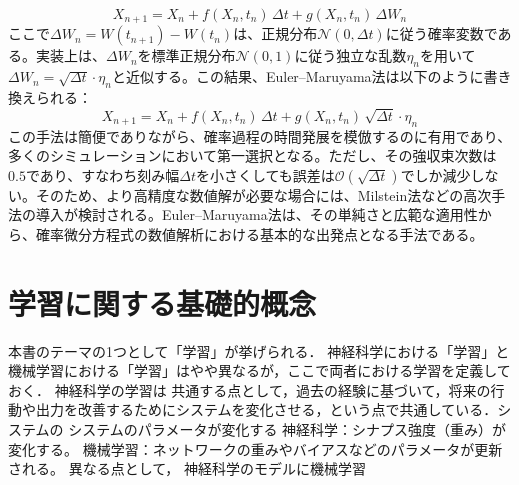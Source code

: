\begin{equation}
X_{n+1} = X_n + f(X_n, t_n)\, \Delta t + g(X_n, t_n)\, \Delta W_n
\end{equation}
ここで$\Delta W_n = W(t_{n+1}) - W(t_n)$は、正規分布$\mathcal{N}(0, \Delta t)$に従う確率変数である。実装上は、$\Delta W_n$を標準正規分布$\mathcal{N}(0, 1)$に従う独立な乱数$\eta_n$を用いて$\Delta W_n = \sqrt{\Delta t} \cdot \eta_n$と近似する。この結果、Euler–Maruyama法は以下のように書き換えられる：
\begin{equation}
X_{n+1} = X_n + f(X_n, t_n)\, \Delta t + g(X_n, t_n)\, \sqrt{\Delta t} \cdot \eta_n
\end{equation}
この手法は簡便でありながら、確率過程の時間発展を模倣するのに有用であり、多くのシミュレーションにおいて第一選択となる。ただし、その強収束次数は$0.5$であり、すなわち刻み幅$\Delta t$を小さくしても誤差は$\mathcal{O}(\sqrt{\Delta t})$でしか減少しない。そのため、より高精度な数値解が必要な場合には、Milstein法などの高次手法の導入が検討される。Euler–Maruyama法は、その単純さと広範な適用性から、確率微分方程式の数値解析における基本的な出発点となる手法である。
\section{学習に関する基礎的概念}
本書のテーマの1つとして「学習」が挙げられる．
神経科学における「学習」と機械学習における「学習」はやや異なるが，ここで両者における学習を定義しておく．
神経科学の学習は
共通する点として，過去の経験に基づいて，将来の行動や出力を改善するためにシステムを変化させる，という点で共通している．システムの
システムのパラメータが変化する
神経科学：シナプス強度（重み）が変化する。
機械学習：ネットワークの重みやバイアスなどのパラメータが更新される。
異なる点として，
神経科学のモデルに機械学習
